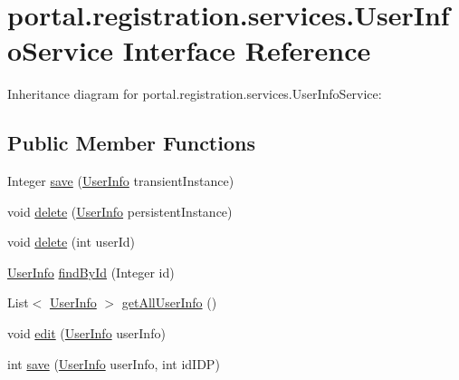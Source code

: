 \hypertarget{interfaceportal_1_1registration_1_1services_1_1UserInfoService}{
\section{portal.registration.services.UserInfoService Interface Reference}
\label{interfaceportal_1_1registration_1_1services_1_1UserInfoService}
}


Inheritance diagram for portal.registration.services.UserInfoService:
\subsection*{Public Member Functions}
\begin{DoxyCompactItemize}
\item 
Integer \hyperlink{interfaceportal_1_1registration_1_1services_1_1UserInfoService_abb06f632b024da6c7458c5d0ee4cc456}{save} (\hyperlink{classportal_1_1registration_1_1domain_1_1UserInfo}{UserInfo} transientInstance)
\item 
void \hyperlink{interfaceportal_1_1registration_1_1services_1_1UserInfoService_aa458e4d758973ed5f22fe7af839064fc}{delete} (\hyperlink{classportal_1_1registration_1_1domain_1_1UserInfo}{UserInfo} persistentInstance)
\item 
void \hyperlink{interfaceportal_1_1registration_1_1services_1_1UserInfoService_a0b419e147d97414e30baafe11b44ade5}{delete} (int userId)
\item 
\hyperlink{classportal_1_1registration_1_1domain_1_1UserInfo}{UserInfo} \hyperlink{interfaceportal_1_1registration_1_1services_1_1UserInfoService_a27530d570ec61a3376c655212d0f070a}{findById} (Integer id)
\item 
List$<$ \hyperlink{classportal_1_1registration_1_1domain_1_1UserInfo}{UserInfo} $>$ \hyperlink{interfaceportal_1_1registration_1_1services_1_1UserInfoService_a242b07321e766bd2d400cd575ea97dfb}{getAllUserInfo} ()
\item 
void \hyperlink{interfaceportal_1_1registration_1_1services_1_1UserInfoService_ad0df285c951d11fcf3c1ccd263a39989}{edit} (\hyperlink{classportal_1_1registration_1_1domain_1_1UserInfo}{UserInfo} userInfo)
\item 
int \hyperlink{interfaceportal_1_1registration_1_1services_1_1UserInfoService_a804ca2b3bc236ed56c5940a230b56b86}{save} (\hyperlink{classportal_1_1registration_1_1domain_1_1UserInfo}{UserInfo} userInfo, int idIDP)
\end{DoxyCompactItemize}


